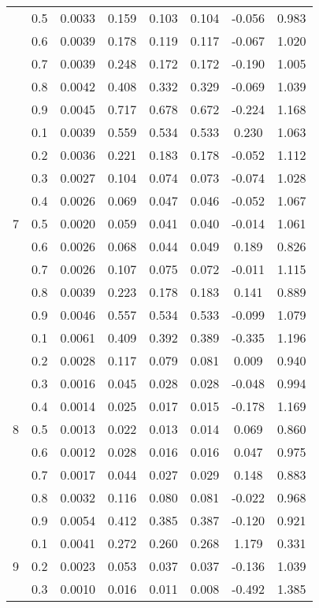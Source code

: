 \documentclass[11pt,a4paper]{report}
\begin{document}
\begin{longtable}{ | c | c || c | c | c | c | c | c | }
 & 0.5 & 0.0033 & 0.159 & 0.103 & 0.104 & -0.056 & 0.983 \\
 & 0.6 & 0.0039 & 0.178 & 0.119 & 0.117 & -0.067 & 1.020 \\
 & 0.7 & 0.0039 & 0.248 & 0.172 & 0.172 & -0.190 & 1.005 \\
 & 0.8 & 0.0042 & 0.408 & 0.332 & 0.329 & -0.069 & 1.039 \\
 & 0.9 & 0.0045 & 0.717 & 0.678 & 0.672 & -0.224 & 1.168 \\
 \hline
\multirow{9}{*}{7} & 0.1 & 0.0039 & 0.559 & 0.534 & 0.533 & 0.230 & 1.063 \\
 & 0.2 & 0.0036 & 0.221 & 0.183 & 0.178 & -0.052 & 1.112 \\
 & 0.3 & 0.0027 & 0.104 & 0.074 & 0.073 & -0.074 & 1.028 \\
 & 0.4 & 0.0026 & 0.069 & 0.047 & 0.046 & -0.052 & 1.067 \\
 & 0.5 & 0.0020 & 0.059 & 0.041 & 0.040 & -0.014 & 1.061 \\
 & 0.6 & 0.0026 & 0.068 & 0.044 & 0.049 & 0.189 & 0.826 \\
 & 0.7 & 0.0026 & 0.107 & 0.075 & 0.072 & -0.011 & 1.115 \\
 & 0.8 & 0.0039 & 0.223 & 0.178 & 0.183 & 0.141 & 0.889 \\
 & 0.9 & 0.0046 & 0.557 & 0.534 & 0.533 & -0.099 & 1.079 \\
 \hline
\multirow{9}{*}{8} & 0.1 & 0.0061 & 0.409 & 0.392 & 0.389 & -0.335 & 1.196 \\
 & 0.2 & 0.0028 & 0.117 & 0.079 & 0.081 & 0.009 & 0.940 \\
 & 0.3 & 0.0016 & 0.045 & 0.028 & 0.028 & -0.048 & 0.994 \\
 & 0.4 & 0.0014 & 0.025 & 0.017 & 0.015 & -0.178 & 1.169 \\
 & 0.5 & 0.0013 & 0.022 & 0.013 & 0.014 & 0.069 & 0.860 \\
 & 0.6 & 0.0012 & 0.028 & 0.016 & 0.016 & 0.047 & 0.975 \\
 & 0.7 & 0.0017 & 0.044 & 0.027 & 0.029 & 0.148 & 0.883 \\
 & 0.8 & 0.0032 & 0.116 & 0.080 & 0.081 & -0.022 & 0.968 \\
 & 0.9 & 0.0054 & 0.412 & 0.385 & 0.387 & -0.120 & 0.921 \\
 \hline
\multirow{9}{*}{9} & 0.1 & 0.0041 & 0.272 & 0.260 & 0.268 & 1.179 & 0.331 \\
 & 0.2 & 0.0023 & 0.053 & 0.037 & 0.037 & -0.136 & 1.039 \\
 & 0.3 & 0.0010 & 0.016 & 0.011 & 0.008 & -0.492 & 1.385 \\

\end{longtable}
\end{document}
